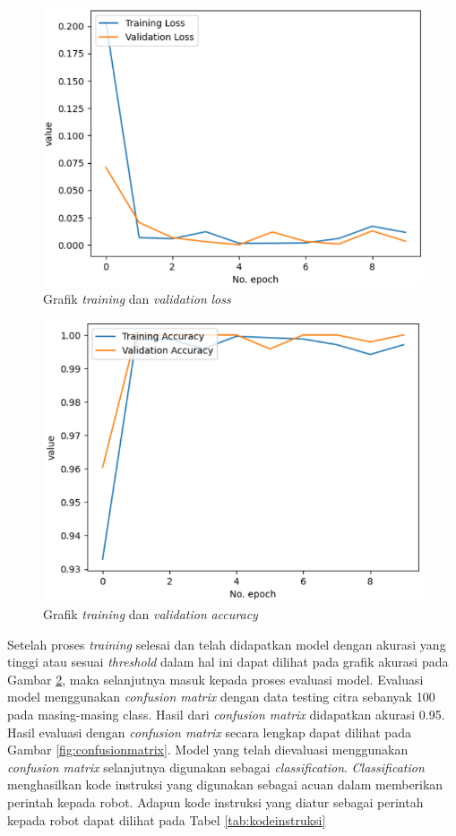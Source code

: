 \begin{figure}[H]
  \centering
  \includegraphics[width=0.7\linewidth]{gambar/loss.png}
  \caption{Grafik \emph{training} dan \emph{validation} \emph{loss}}
  \label{fig:loss}
\end{figure}

\begin{figure}[H]
  \centering
  \includegraphics[width=0.7\linewidth]{gambar/akurasi.png}
  \caption{Grafik \emph{training} dan \emph{validation} \emph{accuracy}}
  \label{fig:akurasi}
\end{figure}

Setelah proses \emph{training} selesai dan telah didapatkan model dengan akurasi yang tinggi atau sesuai \emph{threshold} dalam hal ini dapat dilihat pada grafik akurasi pada Gambar \ref{fig:akurasi}, maka selanjutnya masuk kepada proses evaluasi model. Evaluasi model menggunakan \emph{confusion matrix} dengan data testing citra sebanyak 100 pada masing-masing class. Hasil dari \emph{confusion matrix} didapatkan akurasi 0.95. Hasil evaluasi dengan \emph{confusion matrix} secara lengkap dapat dilihat pada Gambar \ref{fig:confusionmatrix}. Model yang telah dievaluasi menggunakan \emph{confusion matrix} selanjutnya digunakan sebagai \emph{classification}. \emph{Classification} menghasilkan kode instruksi yang digunakan sebagai acuan dalam memberikan perintah kepada robot. Adapun kode instruksi yang diatur sebagai perintah kepada robot dapat dilihat pada Tabel \ref{tab:kodeinstruksi}

